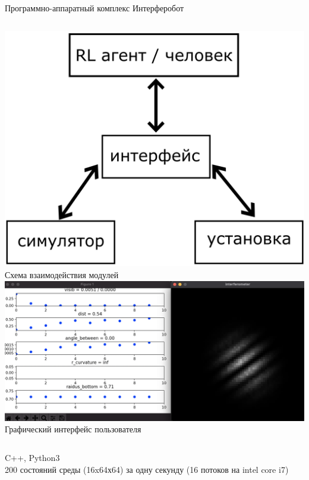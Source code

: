 \begin{frame}{Программно-аппаратный комплекс Интерферобот}
\begin{columns}
\centering
\includegraphics[width=1\linewidth]{images/interferobot_complex.png}
Схема взаимодействия модулей
\centering
\includegraphics[width=1\linewidth]{images/gui.png}
Графический интерфейс пользователя
\end{columns}
\vspace{15pt}
C++, Python3\\
200 состояний среды (16x64х64) за одну секунду (16 потоков на intel core i7)
\end{frame}

